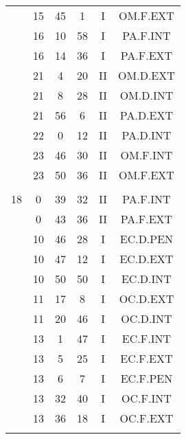 \documentclass[12pt, a4paper]{article}
\begin{document}
\begin{multicols}{3}
{\begin{tabular}{c c c c c c}
	 	 	 	 & 15 & 45 & 1 & I & OM.F.EXT\\%
	 	 	 	 & 16 & 10 & 58 & I & PA.F.INT\\%
	 	 	 	 & 16 & 14 & 36 & I & PA.F.EXT\\%
	 	 	 	 & 21 & 4 & 20 & II & OM.D.EXT\\%
	 	 	 	 & 21 & 8 & 28 & II & OM.D.INT\\%
	 	 	 	 & 21 & 56 & 6 & II & PA.D.EXT\\%
	 	 	 	 & 22 & 0 & 12 & II & PA.D.INT\\%
	 	 	 	 & 23 & 46 & 30 & II & OM.F.INT\\%
	 	 	 	 & 23 & 50 & 36 & II & OM.F.EXT\\%
	 	 	 	 & & & & & \\%
	 	 	 	18 & 0 & 39 & 32 & II & PA.F.INT\\%
	 	 	 	 & 0 & 43 & 36 & II & PA.F.EXT\\%
	 	 	 	 & 10 & 46 & 28 & I & EC.D.PEN\\%
	 	 	 	 & 10 & 47 & 12 & I & EC.D.EXT\\%
	 	 	 	 & 10 & 50 & 50 & I & EC.D.INT\\%
	 	 	 	 & 11 & 17 & 8 & I & OC.D.EXT\\%
	 	 	 	 & 11 & 20 & 46 & I & OC.D.INT\\%
	 	 	 	 & 13 & 1 & 47 & I & EC.F.INT\\%
	 	 	 	 & 13 & 5 & 25 & I & EC.F.EXT\\%
	 	 	 	 & 13 & 6 & 7 & I & EC.F.PEN\\%
	 	 	 	 & 13 & 32 & 40 & I & OC.F.INT\\%
	 	 	 	 & 13 & 36 & 18 & I & OC.F.EXT\\%
	 	 	 	 & & & & & \\%

\end{tabular}}
\end{multicols}
\end{document}
